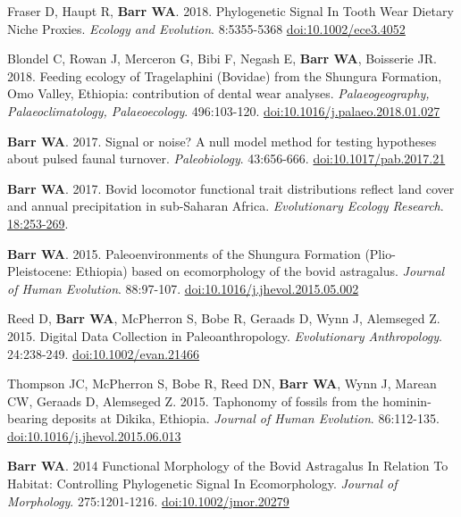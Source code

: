 \item  Fraser D, Haupt R,  {\bfseries Barr WA}. 2018. Phylogenetic Signal In Tooth Wear Dietary Niche Proxies. \emph{Ecology and Evolution}. 8:5355-5368 \href{https://doi.org/10.1002/ece3.4052}{doi:10.1002/ece3.4052}

\item  Blondel C, Rowan J, Merceron G, Bibi F,  Negash E, {\bfseries Barr WA}, Boisserie JR. 2018. Feeding ecology of Tragelaphini (Bovidae) from the Shungura Formation, Omo Valley, Ethiopia: contribution of dental wear analyses.  \emph{Palaeogeography, Palaeoclimatology, Palaeoecology}. 496:103-120. \href{https://doi.org/10.1016/j.palaeo.2018.01.027}{doi:10.1016/j.palaeo.2018.01.027}

\item  {\bfseries Barr WA}. 2017. Signal or noise? A null model method for testing hypotheses about pulsed faunal turnover. \emph{Paleobiology}. 43:656-666. \href{https://doi.org/10.1017/pab.2017.21}{doi:10.1017/pab.2017.21}

\item  {\bfseries Barr WA}. 2017. Bovid locomotor functional trait distributions reflect land cover and annual precipitation in sub-Saharan Africa. \emph{Evolutionary Ecology Research}.  \href{http://www.evolutionary-ecology.com/issues/v18/n03/ddar3051.pdf}{18:253-269}.

\item  {\bfseries Barr WA}. 2015. Paleoenvironments of the Shungura Formation (Plio-Pleistocene: Ethiopia) based on ecomorphology of the bovid astragalus. \emph{Journal of Human Evolution}. 88:97-107. \href{http://dx.doi.org/10.1016/j.jhevol.2015.05.002}{doi:10.1016/j.jhevol.2015.05.002}

\item  Reed D, {\bfseries Barr WA}, McPherron S, Bobe R, Geraads D, Wynn J, Alemseged Z. 2015. Digital Data Collection in Paleoanthropology. \emph{Evolutionary Anthropology}. 24:238-249. \href{http://dx.doi.org/10.1002/evan.21466}{doi:10.1002/evan.21466}

\item  Thompson JC, McPherron S, Bobe R, Reed DN, {\bfseries Barr WA}, Wynn J, Marean CW, Geraads D, Alemseged Z. 2015. Taphonomy of fossils from the hominin-bearing deposits at Dikika, Ethiopia. \emph{Journal of Human Evolution}. 86:112-135. \href{http://dx.doi.org/10.1016/j.jhevol.2015.06.013}{doi:10.1016/j.jhevol.2015.06.013}

\item  {\bfseries Barr WA}. 2014 Functional Morphology of the Bovid Astragalus In Relation To Habitat: Controlling Phylogenetic Signal In Ecomorphology. \emph{Journal of Morphology}. 275:1201-1216. \href{http://dx.doi.org/10.1002/jmor.20279}{doi:10.1002/jmor.20279}

